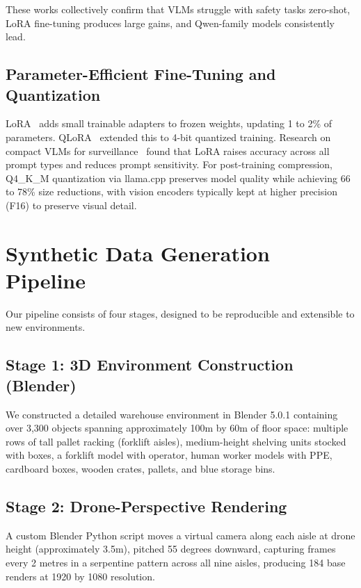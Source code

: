 \documentclass[12pt, a4paper]{article}
\begin{document}
These works collectively confirm that VLMs struggle with safety tasks zero-shot, LoRA fine-tuning produces large gains, and Qwen-family models consistently lead.

\subsection{Parameter-Efficient Fine-Tuning and Quantization}

LoRA~\cite{hu2022lora} adds small trainable adapters to frozen weights, updating 1 to 2\% of parameters. QLoRA~\cite{dettmers2023qlora} extended this to 4-bit quantized training. Research on compact VLMs for surveillance~\cite{compactVLMbenchmark2025} found that LoRA raises accuracy across all prompt types and reduces prompt sensitivity. For post-training compression, Q4\_K\_M quantization via llama.cpp preserves model quality while achieving 66 to 78\% size reductions, with vision encoders typically kept at higher precision (F16) to preserve visual detail.

\section{Synthetic Data Generation Pipeline}

Our pipeline consists of four stages, designed to be reproducible and extensible to new environments.

\subsection{Stage 1: 3D Environment Construction (Blender)}

We constructed a detailed warehouse environment in Blender 5.0.1 containing over 3,300 objects spanning approximately 100m by 60m of floor space: multiple rows of tall pallet racking (forklift aisles), medium-height shelving units stocked with boxes, a forklift model with operator, human worker models with PPE, cardboard boxes, wooden crates, pallets, and blue storage bins.

\subsection{Stage 2: Drone-Perspective Rendering}

A custom Blender Python script moves a virtual camera along each aisle at drone height (approximately 3.5m), pitched 55 degrees downward, capturing frames every 2 metres in a serpentine pattern across all nine aisles, producing 184 base renders at 1920 by 1080 resolution.
\end{document}
